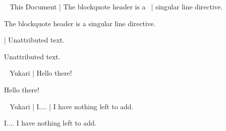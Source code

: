 \begin{examples}
  \begin{examplesource}
~ This Document
| The blockquote header is a \
| singular line directive.
  \end{examplesource}
  \begin{exampleoutput}
    \begin{blockquote}
      The blockquote header is a singular line directive.
    \end{blockquote}
  \end{exampleoutput}
  \begin{examplesource}
| Unattributed text.
  \end{examplesource}
  \begin{exampleoutput}
    \begin{blockquote}
      Unattributed text.
    \end{blockquote}
  \end{exampleoutput}
  \begin{examplesource}
~ Yukari | Hello there!
  \end{examplesource}
  \begin{exampleoutput}
    \begin{blockquote}[Yukari]
      Hello there!
    \end{blockquote}
  \end{exampleoutput}
  \begin{examplesource}
~ Yukari | I....
         | I have nothing left to add.
  \end{examplesource}
  \begin{exampleoutput}
    \begin{blockquote}[Yukari]
      I....\linebreak
      I have nothing left to add.
    \end{blockquote}
  \end{exampleoutput}
\end{examples}

